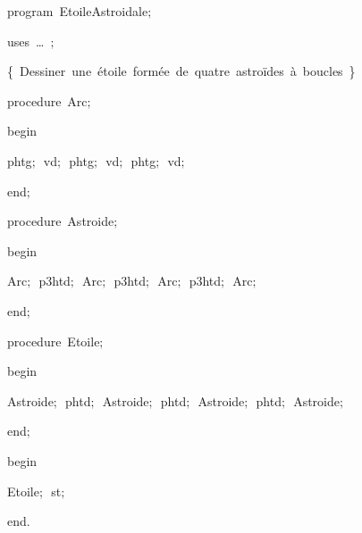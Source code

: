
{
\parindent {}
\medskip

\carrenoir
\vspace{\neglskip}\mbox{\blc  \idt  \mcl program\idt \ EtoileAstroidale$;$
}\par 
\vspace{\neglskip}\mbox{\blc \blk\idt \mcl uses\idt \ \ldots\ $;$
}\par 
\vspace{\neglskip}\mbox{\blc  \blk\idt  \cmt  \{\ Dessiner\ une\ étoile\ formée\ de\ quatre\ astroïdes\ à\ boucles\ \}\idt }\par 
\medskip

\pagebreak[3] 
\vspace{\neglskip}\mbox{\blc  \blk\idt  \mcl procedure\idt \ Arc$;$}\par 
\vspace{\neglskip}\mbox{\blc  \blk\idt  \mcl begin\idt }\par 
\vspace{\neglskip}\mbox{\blc  \blk\blk\idt  phtg$;$\ vd$;$\ phtg$;$\ vd$;$\ phtg$;$\ vd$;$\ }\par 
\vspace{\neglskip}\mbox{\blc  \blk\idt  \mcl end\idt $;$}\par 
\medskip

\pagebreak[3] 
\vspace{\neglskip}\mbox{\blc  \blk\idt  \mcl procedure\idt \ Astroide$;$}\par 
\vspace{\neglskip}\mbox{\blc  \blk\idt  \mcl begin\idt }\par 
\vspace{\neglskip}\mbox{\blc  \blk\blk\idt  Arc$;$\ p3htd$;$\ Arc$;$\ p3htd$;$\ Arc$;$\ p3htd$;$\ Arc$;$}\par 
\vspace{\neglskip}\mbox{\blc  \blk\idt  \mcl end\idt $;$}\par 
\medskip

\pagebreak[3] 
\vspace{\neglskip}\mbox{\blc  \blk\idt  \mcl procedure\idt \ Etoile$;$}\par 
\vspace{\neglskip}\mbox{\blc  \blk\idt  \mcl begin\idt }\par 
\vspace{\neglskip}\mbox{\blc  \blk\blk\idt  Astroide$;$\ phtd$;$\ Astroide$;$\ phtd$;$\ Astroide$;$\ phtd$;$\ Astroide$;$\ }\par 
\vspace{\neglskip}\mbox{\blc  \blk\idt  \mcl end\idt $;$}\par 
\medskip

\vspace{\neglskip}\mbox{\blc  \idt  \mcl begin\idt }\par 
\vspace{\neglskip}\mbox{\blc  \blk\idt  Etoile$;$\ st$;$\ }\par 
\vspace{\neglskip}\mbox{\blc  \idt  \mcl end\idt $.$}\par 

\medskip }

